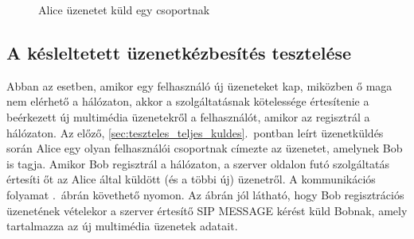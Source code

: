 \begin{figure}[htb]
\center
{}
\caption{Alice üzenetet küld egy csoportnak}
\label{fig:teszt-vtf-kuldes-01}
\end{figure}

\subsection{A késleltetett üzenetkézbesítés tesztelése}
\label{sec:teszteles_kesleltetett_kezbesites}

Abban az esetben, amikor egy felhasználó új üzeneteket kap, miközben ő maga nem elérhető a hálózaton, akkor a szolgáltatásnak kötelessége értesítenie a beérkezett új multimédia üzenetekről a felhasználót, amikor az regisztrál a hálózaton. Az előző, \ref{sec:teszteles_teljes_kuldes}.~pontban leírt üzenetküldés során Alice egy olyan felhasználói csoportnak címezte az üzenetet, amelynek Bob is tagja. Amikor Bob regisztrál a hálózaton, a szerver oldalon futó szolgáltatás értesíti őt az Alice által küldött (és a többi új) üzenetről. A kommunikációs folyamat .~ábrán követhető nyomon. Az ábrán jól látható, hogy Bob regisztrációs üzenetének vételekor a szerver értesítő SIP MESSAGE kérést küld Bobnak, amely tartalmazza az új multimédia üzenetek adatait.

